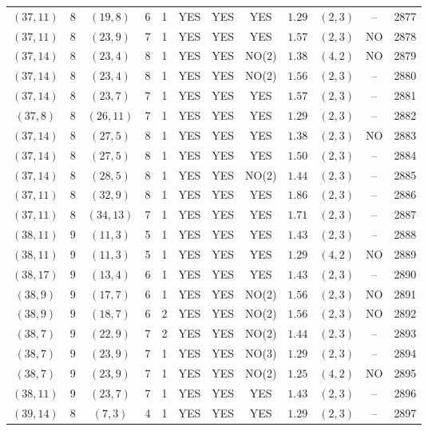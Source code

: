 \begin{longtable}{|c|c|c|c|c|c|c|c|c|c|c|c|}
$(37,11)$ & 8 & $(19,8)$ & 6 & 1 & YES & YES & YES & $1.29$ & $(2,3)$ & -- & 2877\\
$(37,11)$ & 8 & $(23,9)$ & 7 & 1 & YES & YES & YES & $1.57$ & $(2,3)$ & NO & 2878\\
$(37,14)$ & 8 & $(23,4)$ & 8 & 1 & YES & YES & NO(2) & $1.38$ & $(4,2)$ & NO & 2879\\
$(37,14)$ & 8 & $(23,4)$ & 8 & 1 & YES & YES & NO(2) & $1.56$ & $(2,3)$ & -- & 2880\\
$(37,14)$ & 8 & $(23,7)$ & 7 & 1 & YES & YES & YES & $1.57$ & $(2,3)$ & -- & 2881\\
$(37,8)$ & 8 & $(26,11)$ & 7 & 1 & YES & YES & YES & $1.29$ & $(2,3)$ & -- & 2882\\
$(37,14)$ & 8 & $(27,5)$ & 8 & 1 & YES & YES & YES & $1.38$ & $(2,3)$ & NO & 2883\\
$(37,14)$ & 8 & $(27,5)$ & 8 & 1 & YES & YES & YES & $1.50$ & $(2,3)$ & -- & 2884\\
$(37,14)$ & 8 & $(28,5)$ & 8 & 1 & YES & YES & NO(2) & $1.44$ & $(2,3)$ & -- & 2885\\
$(37,11)$ & 8 & $(32,9)$ & 8 & 1 & YES & YES & YES & $1.86$ & $(2,3)$ & -- & 2886\\
$(37,11)$ & 8 & $(34,13)$ & 7 & 1 & YES & YES & YES & $1.71$ & $(2,3)$ & -- & 2887\\
$(38,11)$ & 9 & $(11,3)$ & 5 & 1 & YES & YES & YES & $1.43$ & $(2,3)$ & -- & 2888\\
$(38,11)$ & 9 & $(11,3)$ & 5 & 1 & YES & YES & YES & $1.29$ & $(4,2)$ & NO & 2889\\
$(38,17)$ & 9 & $(13,4)$ & 6 & 1 & YES & YES & YES & $1.43$ & $(2,3)$ & -- & 2890\\
$(38,9)$ & 9 & $(17,7)$ & 6 & 1 & YES & YES & NO(2) & $1.56$ & $(2,3)$ & NO & 2891\\
$(38,9)$ & 9 & $(18,7)$ & 6 & 2 & YES & YES & NO(2) & $1.56$ & $(2,3)$ & NO & 2892\\
$(38,7)$ & 9 & $(22,9)$ & 7 & 2 & YES & YES & NO(2) & $1.44$ & $(2,3)$ & -- & 2893\\
$(38,7)$ & 9 & $(23,9)$ & 7 & 1 & YES & YES & NO(3) & $1.29$ & $(2,3)$ & -- & 2894\\
$(38,7)$ & 9 & $(23,9)$ & 7 & 1 & YES & YES & NO(2) & $1.25$ & $(4,2)$ & NO & 2895\\
$(38,11)$ & 9 & $(23,7)$ & 7 & 1 & YES & YES & YES & $1.43$ & $(2,3)$ & -- & 2896\\
$(39,14)$ & 8 & $(7,3)$ & 4 & 1 & YES & YES & YES & $1.29$ & $(2,3)$ & -- & 2897\\

\end{longtable}
